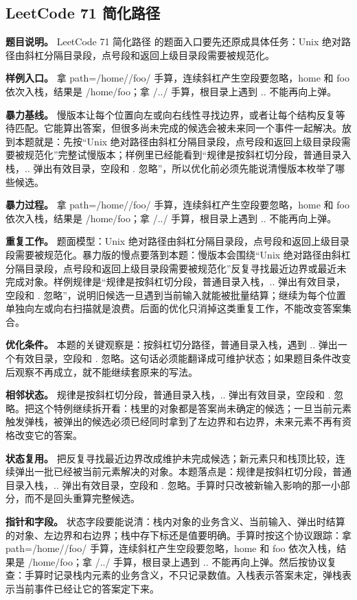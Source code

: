 \subsection{LeetCode 71 简化路径}

\textbf{题目说明。} LeetCode 71 简化路径 的题面入口要先还原成具体任务：Unix 绝对路径由斜杠分隔目录段，点号段和返回上级目录段需要被规范化。

\textbf{样例入口。} 拿 path=/home//foo/ 手算，连续斜杠产生空段要忽略，home 和 foo 依次入栈，结果是 /home/foo；拿 /../ 手算，根目录上遇到 .. 不能再向上弹。

\textbf{暴力基线。} 慢版本让每个位置向左或向右线性寻找边界，或者让每个结构反复等待匹配。它能算出答案，但很多尚未完成的候选会被未来同一个事件一起解决。放到本题就是：先按“Unix 绝对路径由斜杠分隔目录段，点号段和返回上级目录段需要被规范化”完整试慢版本；样例里已经能看到“规律是按斜杠切分段，普通目录入栈，.. 弹出有效目录，空段和 . 忽略”，所以优化前必须先能说清慢版本枚举了哪些候选。

\textbf{暴力过程。} 拿 path=/home//foo/ 手算，连续斜杠产生空段要忽略，home 和 foo 依次入栈，结果是 /home/foo；拿 /../ 手算，根目录上遇到 .. 不能再向上弹。

\textbf{重复工作。} 题面模型：Unix 绝对路径由斜杠分隔目录段，点号段和返回上级目录段需要被规范化。暴力版的慢点要落到本题：慢版本会围绕“Unix 绝对路径由斜杠分隔目录段，点号段和返回上级目录段需要被规范化”反复寻找最近边界或最近未完成对象。样例规律是“规律是按斜杠切分段，普通目录入栈，.. 弹出有效目录，空段和 . 忽略”，说明旧候选一旦遇到当前输入就能被批量结算；继续为每个位置单独向左或向右扫描就是浪费。后面的优化只消掉这类重复工作，不能改变答案集合。

\textbf{优化条件。} 本题的关键观察是：按斜杠切分路径，普通目录入栈，遇到 .. 弹出一个有效目录，空段和 . 忽略。这句话必须能翻译成可维护状态；如果题目条件改变后观察不再成立，就不能继续套原来的写法。

\textbf{相邻状态。} 规律是按斜杠切分段，普通目录入栈，.. 弹出有效目录，空段和 . 忽略。把这个特例继续拆开看：栈里的对象都是答案尚未确定的候选；一旦当前元素触发弹栈，被弹出的候选必须已经同时拿到了左边界和右边界，未来元素不再有资格改变它的答案。

\textbf{状态复用。} 把反复寻找最近边界改成维护未完成候选；新元素只和栈顶比较，连续弹出一批已经被当前元素解决的对象。本题落点是：规律是按斜杠切分段，普通目录入栈，.. 弹出有效目录，空段和 . 忽略。手算时只改被新输入影响的那一小部分，而不是回头重算完整候选。

\textbf{指针和字段。} 状态字段要能说清：栈内对象的业务含义、当前输入、弹出时结算的对象、左边界和右边界；栈中存下标还是值要明确。手算时按这个协议跟踪：拿 path=/home//foo/ 手算，连续斜杠产生空段要忽略，home 和 foo 依次入栈，结果是 /home/foo；拿 /../ 手算，根目录上遇到 .. 不能再向上弹。然后按协议复查：手算时记录栈内元素的业务含义，不只记录数值。入栈表示答案未定，弹栈表示当前事件已经让它的答案定下来。

